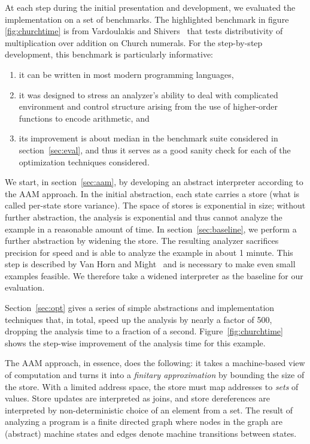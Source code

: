 \documentclass[9pt]{sigplanconf} %
\begin{document}
At each step during the initial presentation and development, we evaluated the implementation on a set of benchmarks.
%
The highlighted benchmark in figure \ref{fig:churchtime} is from Vardoulakis and Shivers~\cite{dvanhorn:Vardoulakis2011CFA2} that tests distributivity of multiplication over addition on Church numerals.
%
For the step-by-step development, this benchmark is particularly informative:
\begin{enumerate}
\item it can be written in most modern programming languages,
%
\item it was designed to stress an analyzer's ability to deal with complicated environment and control structure arising from the use of higher-order functions to encode arithmetic, and
%
\item its improvement is about median in the benchmark suite considered in section~\ref{sec:eval}, and thus it serves as a good sanity check for each of the optimization techniques considered.
\end{enumerate}

We start, in section~\ref{sec:aam}, by developing an abstract interpreter according to the AAM approach.
%
In the initial abstraction, each state carries a store (what is called per-state store variance).
%
The space of stores is exponential in size; without further abstraction, the analysis is exponential and thus cannot analyze the example in a reasonable amount of time.
%
In section~\ref{sec:baseline}, we perform a further abstraction by widening the store.
%
The resulting analyzer sacrifices precision for speed and is able to analyze the example in about 1 minute.
%
This step is described by Van Horn and Might~\cite[\S 3.5--6]{dvanhorn:VanHorn2012Systematic} and is necessary to make even small examples feasible.
%
We therefore take a widened interpreter as the baseline for our evaluation.

Section~\ref{sec:opt} gives a series of simple abstractions and implementation techniques that, in total, speed up the analysis by nearly a factor of 500, dropping the analysis time to a fraction of a second.
%
Figure~\ref{fig:churchtime} shows the step-wise improvement of the analysis time for this example.

The AAM approach, in essence, does the following: it takes a machine-based view of computation and turns it into a \emph{finitary approximation} by bounding the size of the store.
%
With a limited address space, the store must map addresses to \emph{sets} of values.
%
Store updates are interpreted as joins, and store dereferences are interpreted by non-deterministic choice of an element from a set.
%
The result of analyzing a program is a finite directed graph where nodes in the graph are (abstract) machine states and edges denote machine transitions between states.
\end{document}
